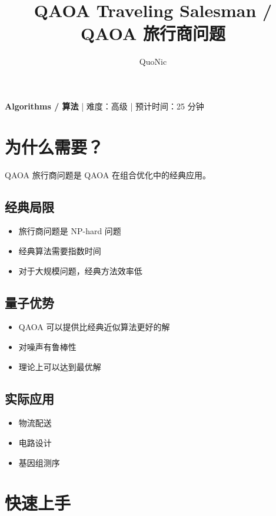 \documentclass[12pt,a4paper]{article}
\title{QAOA Traveling Salesman / QAOA 旅行商问题}
\author{QuoNic}
\date{}
\begin{document}
\maketitle

\begin{center}
\textbf{Algorithms / 算法} | 难度：高级 | 预计时间：25 分钟
\end{center}

\tableofcontents
\newpage

\section{为什么需要？}

QAOA 旅行商问题是 QAOA 在组合优化中的经典应用。

\subsection{经典局限}
\begin{itemize}
  \item 旅行商问题是 NP-hard 问题
  \item 经典算法需要指数时间
  \item 对于大规模问题，经典方法效率低
\end{itemize}

\subsection{量子优势}
\begin{itemize}
  \item QAOA 可以提供比经典近似算法更好的解
  \item 对噪声有鲁棒性
  \item 理论上可以达到最优解
\end{itemize}

\subsection{实际应用}
\begin{itemize}
  \item 物流配送
  \item 电路设计
  \item 基因组测序
\end{itemize}

\section{快速上手}
\end{document}
